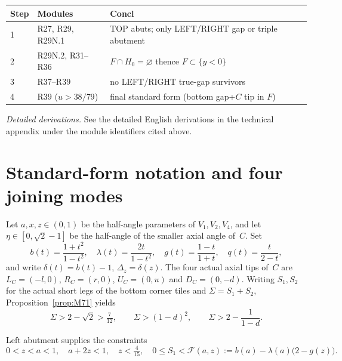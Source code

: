 \documentclass[11pt,reqno]{amsart}
\theoremstyle{definition}
\begin{document}
\begin{center}
\small
\begin{tabular}{@{}p{}p{}p{}@{}}
\toprule
Step & Modules & Concl \\
\midrule
1 & R27, R29, R29N.1 & TOP abuts; only LEFT/RIGHT gap or triple abutment \\
2 & R29N.2, R31--R36 & $F\cap H_0=\varnothing$ thence $F\subset\{y<0\}$ \\
3 & R37--R39 & no LEFT/RIGHT true-gap survivors \\
4 & R39 ($u>38/79$) & final standard form (bottom gap+$C$ tip in $F$) \\
\bottomrule
\end{tabular}
\end{center}
\smallskip
\noindent\emph{Detailed derivations.} See the detailed English derivations in the technical appendix under the module identifiers cited above.

\section{Standard-form notation and four joining modes}\label{sec:std}

Let $a,x,z\in(0,1)$ be the half-angle parameters of $V_1,V_2,V_4$, and let
$\eta\in[0,\sqrt2-1]$ be the half-angle of the smaller axial angle of~$C$.  Set
\begin{equation}\label{eq:M8}
b(t)=\frac{1+t^2}{1-t^2},\quad
\lambda(t)=\frac{2t}{1-t^2},\quad
g(t)=\frac{1-t}{1+t},\quad
q(t)=\frac{t}{2-t},
\end{equation}
and write $\delta(t)=b(t)-1$, $\Delta_z=\delta(z)$.  The four actual axial tips
of~$C$ are $L_C=(-l,0)$, $R_C=(r,0)$, $U_C=(0,u)$ and $D_C=(0,-d)$.  Writing
$S_1,S_2$ for the actual short legs of the bottom corner tiles and
$\Sigma=S_1+S_2$, Proposition~\ref{prop:M71} yields
\begin{equation}\label{eq:M9}
\Sigma>2-\sqrt2>\tfrac7{12},\qquad
\Sigma>(1-d)^2,\qquad
\Sigma>2-\frac1{1-d}.
\end{equation}


Left abutment supplies the constraints
\begin{equation}\label{eq:M10}
0<z<a<1,\quad a+2z<1,\quad z<\tfrac4{15},\quad
0\le S_1<\mathcal F(a,z):=b(a)-\lambda(a)\bigl(2-g(z)\bigr).
\end{equation}
\end{document}
